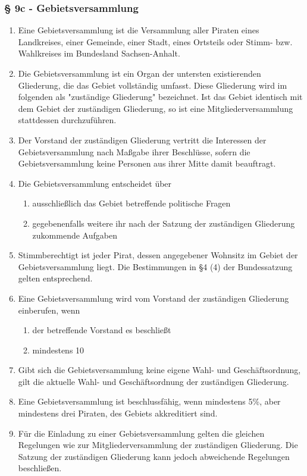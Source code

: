 \subsubsection{§ 9c - Gebietsversammlung}
\begin{enumerate}
\item Eine Gebietsversammlung ist die Versammlung aller Piraten eines Landkreises, einer Gemeinde, einer Stadt, eines Ortsteils oder Stimm- bzw. Wahlkreises im Bundesland Sachsen-Anhalt.

\item Die Gebietsversammlung ist ein Organ der untersten existierenden
Gliederung, die das Gebiet vollständig umfasst. Diese Gliederung wird im
folgenden als "zuständige Gliederung" bezeichnet. Ist das Gebiet identisch mit
dem Gebiet der zuständigen Gliederung, so ist eine Mitgliederversammlung
stattdessen durchzuführen.

\item Der Vorstand der zuständigen Gliederung vertritt die Interessen der
Gebietsversammlung nach Maßgabe ihrer Beschlüsse, sofern die Gebietsversammlung
keine Personen aus ihrer Mitte damit beauftragt.

\item Die Gebietsversammlung entscheidet über
\begin{enumerate}
\item ausschließlich das Gebiet betreffende politische Fragen

\item gegebenenfalls weitere ihr nach der Satzung der zuständigen Gliederung
zukommende Aufgaben
\end{enumerate}

\item Stimmberechtigt ist jeder Pirat, dessen angegebener Wohnsitz im Gebiet der
Gebietsversammlung liegt. Die Bestimmungen in §4 (4) der Bundessatzung gelten
entsprechend.

\item Eine Gebietsversammlung wird vom Vorstand der zuständigen Gliederung
einberufen, wenn
\begin{enumerate}
\item der betreffende Vorstand es beschließt

\item mindestens 10%
\end{enumerate}

\item Gibt sich die Gebietsversammlung keine eigene Wahl- und Geschäftsordnung,
gilt die aktuelle Wahl- und Geschäftsordnung der zuständigen Gliederung.

\item Eine Gebietsversammlung ist beschlussfähig, wenn mindestens 5\%, aber
mindestens drei Piraten, des Gebiets akkreditiert sind.

\item Für die Einladung zu einer Gebietsversammlung gelten die gleichen
Regelungen wie zur Mitgliederversammlung der zuständigen Gliederung. Die Satzung
der zuständigen Gliederung kann jedoch abweichende Regelungen beschließen.
\end{enumerate}

